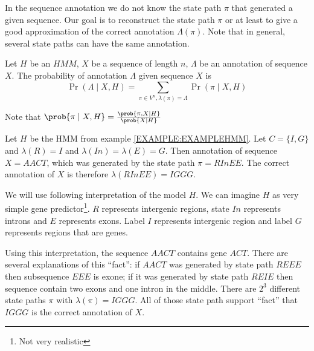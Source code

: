 In the sequence annotation we do not know the state path $\pi$ that generated a given
sequence. Our goal is to reconstruct the state path $\pi$ or at least to give a good
approximation of the correct annotation $\Lambda(\pi)$. Note that in general, several state
paths can have the same annotation.


\begin{definition}
Let $H$ be an $HMM$, $X$ be a sequence of length $n$, $\Lambda$ be an annotation of sequence
$X$. The probability of annotation $\Lambda$ given sequence $X$ is 
\begin{equation}
\Pr\left(\Lambda\mid X,H\right)=\sum_{\pi \in V^n,\lambda(\pi) =
\Lambda}\Pr\left(\pi\mid X,H \right)\label{DEF:ANNOTATION:PROBABILITY}
\end{equation}
\end{definition}

Note that $\prob{\pi\mid X,H}=\frac{\prob{\pi,X\mid H}}{\prob{X\mid
H}}$

\begin{example}\label{EXAMPLE:ANNOTATION}
Let $H$ be the HMM from example \ref{EXAMPLE:EXAMPLEHMM}. Let $C=\{I,G\}$ and
$\lambda(R)=I$ and $\lambda(In)=\lambda(E)=G$.  Then annotation of sequence
$X=AACT$, which was generated by the state path $\pi=RInEE$. The correct
annotation of $X$ is therefore  $\lambda(RInEE) =
IGGG$. 

We will use following interpretation of the model $H$. We can imagine $H$ as very simple gene
predictor\footnote{Not very realistic}. $R$ represents intergenic regions, state $In$
represents introns and $E$ represents exons. Label $I$ represents
intergenic region and label $G$ represents regions that are genes.

Using this interpretation, the sequence $AACT$ contains gene $ACT$. There are
several explanations of this ``fact'': if $AACT$ was generated by state path
$REEE$ then subsequence $EEE$ is exone; if it was generated by state path $REIE$
then sequence contain two exons and one intron in the middle. There are $2^3$
different state paths $\pi$ with $\lambda(\pi)=IGGG$.  All of those state path
support ``fact'' that $IGGG$ is the correct annotation of $X$.

\end{example}



